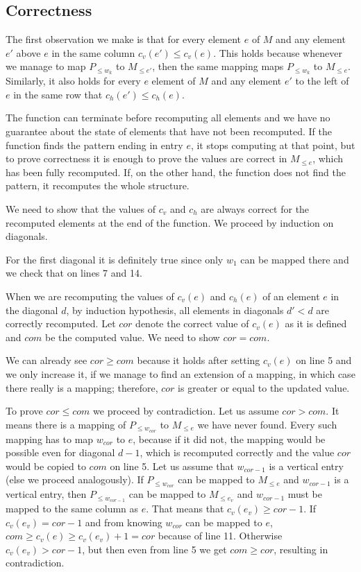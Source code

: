 \subsection{Correctness}
The first observation we make is that for every element $e$ of $M$ and any element $e'$ above $e$ in the same column $c_v(e')\leq c_v(e)$. This holds because whenever we manage to map $P_{\leq w_k}$ to $M_{\leq e'}$, then the same mapping maps $P_{\leq w_k}$ to $M_{\leq e}$. Similarly, it also holds for every $e$ element of $M$ and any element $e'$ to the left of $e$ in the same row that $c_h(e')\leq c_h(e)$.

The function can terminate before recomputing all elements and we have no guarantee about the state of elements that have not been recomputed. If the function finds the pattern ending in entry $e$, it stops computing at that point, but to prove correctness it is enough to prove the values are correct in $M_{\leq e}$, which has been fully recomputed. If, on the other hand, the function does not find the pattern, it recomputes the whole structure.

We need to show that the values of $c_v$ and $c_h$ are always correct for the recomputed elements at the end of the function. We proceed by induction on diagonals.

For the first diagonal it is definitely true since only $w_1$ can be mapped there and we check that on lines 7 and 14.

When we are recomputing the values of $c_v(e)$ and $c_h(e)$ of an element $e$ in the diagonal $d$, by induction hypothesis, all elements in diagonals $d'<d$ are correctly recomputed. Let $cor$ denote the correct value of $c_v(e)$ as it is defined and $com$ be the computed value. We need to show $cor=com$.

We can already see $cor\geq com$ because it holds after setting $c_v(e)$ on line 5 and we only increase it, if we manage to find an extension of a mapping, in which case there really is a mapping; therefore, $cor$ is greater or equal to the updated value.

To prove $cor\leq com$ we proceed by contradiction. Let us assume $cor>com$. It means there is a mapping of $P_{\leq w_{cor}}$ to $M_{\leq e}$ we have never found. Every such mapping has to map $w_{cor}$ to $e$, because if it did not, the mapping would be possible even for diagonal $d-1$, which is recomputed correctly and the value $cor$ would be copied to $com$ on line 5. Let us assume that $w_{cor-1}$ is a vertical entry (else we proceed analogously). If $P_{\leq w_{cor}}$ can be mapped to $M_{\leq e}$ and $w_{cor-1}$ is a vertical entry, then $P_{\leq w_{cor-1}}$ can be mapped to $M_{\leq e_v}$ and $w_{cor-1}$ must be mapped to the same column as $e$. That means that $c_v(e_v)\geq cor-1$. If $c_v(e_v)=cor-1$ and from knowing $w_{cor}$ can be mapped to $e$, $com\geq c_v(e)\geq c_v(e_v)+1=cor$ because of line 11. Otherwise $c_v(e_v)>cor-1$, but then even from line 5 we get $com\geq cor$, resulting in contradiction.

